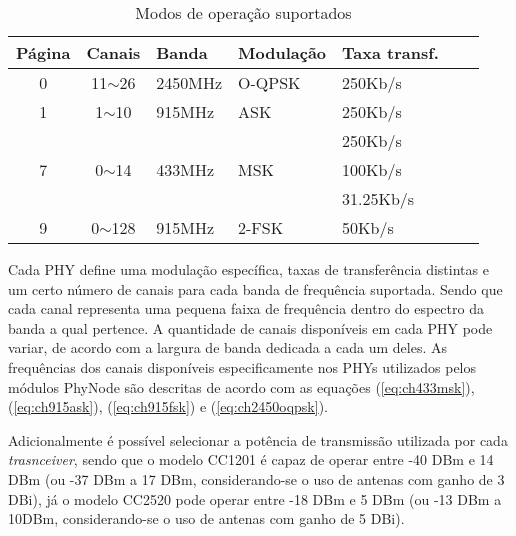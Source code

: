 \documentclass{article}
\begin{document}
	\begin{table}[h]
		\centering
		\begin{tabular}{|c|c|l|l|l|l|l|}
			\hline
			\textbf{Página}    & \multicolumn{1}{l|}{\textbf{Canais}}   & \textbf{Banda}          & \textbf{Modulação}   & \textbf{Taxa transf.} \\ \hline
			0                  & 11$\sim$26                             & 2450MHz                 & O-QPSK               & 250Kb/s               \\ \hline
			1                  & 1$\sim$10                              & 915MHz                  & ASK                  & 250Kb/s               \\ \hline
			\multirow{3}{*}{7} & \multirow{3}{*}{0$\sim$14}             & \multirow{3}{*}{433MHz} & \multirow{3}{*}{MSK} & 250Kb/s               \\
		                       &                                        &                         &                      & 100Kb/s               \\
			                   &                                        &                         &                      & 31.25Kb/s             \\ \hline
			9                  & 0$\sim$128                             & 915MHz                  & 2-FSK                & 50Kb/s                \\ \hline 
		\end{tabular}
		\caption{Modos de operação suportados}
		\label{tab:modos_opr}
	\end{table}
	
	Cada PHY define uma modulação específica, taxas de transferência distintas e um certo número de canais para cada banda de frequência suportada. Sendo que cada canal representa uma pequena faixa de frequência dentro do espectro da banda a qual pertence. A quantidade de canais disponíveis em cada PHY pode variar, de acordo com a largura de banda dedicada a cada um deles. As frequências dos canais disponíveis especificamente nos PHYs utilizados pelos módulos PhyNode são  descritas de acordo com as equações (\ref{eq:ch433msk}), (\ref{eq:ch915ask}), (\ref{eq:ch915fsk}) e (\ref{eq:ch2450oqpsk}).
	
	Adicionalmente é possível selecionar a potência de transmissão utilizada por cada \textit{trasnceiver}, sendo que o modelo CC1201 é capaz de operar entre -40 DBm e 14 DBm (ou -37 DBm a 17 DBm, considerando-se o uso de antenas com ganho de 3 DBi), já o modelo CC2520 pode operar entre -18 DBm e 5 DBm (ou -13 DBm a 10DBm, considerando-se o uso de antenas com ganho de 5 DBi).
	
\end{document}
